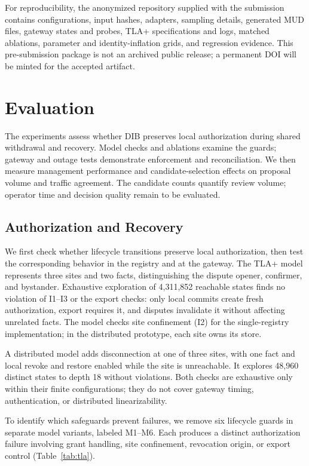 \documentclass[journal]{IEEEtran}
\theoremstyle{definition}
\begin{document}
For reproducibility, the anonymized repository supplied with the submission contains configurations, input hashes, adapters, sampling details, generated MUD files, gateway states and probes, TLA+ specifications and logs, matched ablations, parameter and identity-inflation grids, and regression evidence. This pre-submission package is not an archived public release; a permanent DOI will be minted for the accepted artifact.

\section{Evaluation}
\label{sec:eval}

The experiments assess whether DIB preserves local authorization during shared withdrawal and recovery. Model checks and ablations examine the guards; gateway and outage tests demonstrate enforcement and reconciliation. We then measure management performance and candidate-selection effects on proposal volume and traffic agreement. The candidate counts quantify review volume; operator time and decision quality remain to be evaluated.

\subsection{Authorization and Recovery}
\label{sec:lifecycle-results}
We first check whether lifecycle transitions preserve local authorization, then test the corresponding behavior in the registry and at the gateway. The TLA+ model represents three sites and two facts, distinguishing the dispute opener, confirmer, and bystander. Exhaustive exploration of 4,311,852 reachable states finds no violation of I1--I3 or the export checks: only local commits create fresh authorization, export requires it, and disputes invalidate it without affecting unrelated facts. The model checks site confinement (I2) for the single-registry implementation; in the distributed prototype, each site owns its store.

A distributed model adds disconnection at one of three sites, with one fact and local revoke and restore enabled while the site is unreachable. It explores 48,960 distinct states to depth 18 without violations. Both checks are exhaustive only within their finite configurations; they do not cover gateway timing, authentication, or distributed linearizability.

To identify which safeguards prevent failures, we remove six lifecycle guards in separate model variants, labeled M1--M6. Each produces a distinct authorization failure involving grant handling, site confinement, revocation origin, or export control (Table~\ref{tab:tla}).
\end{document}
